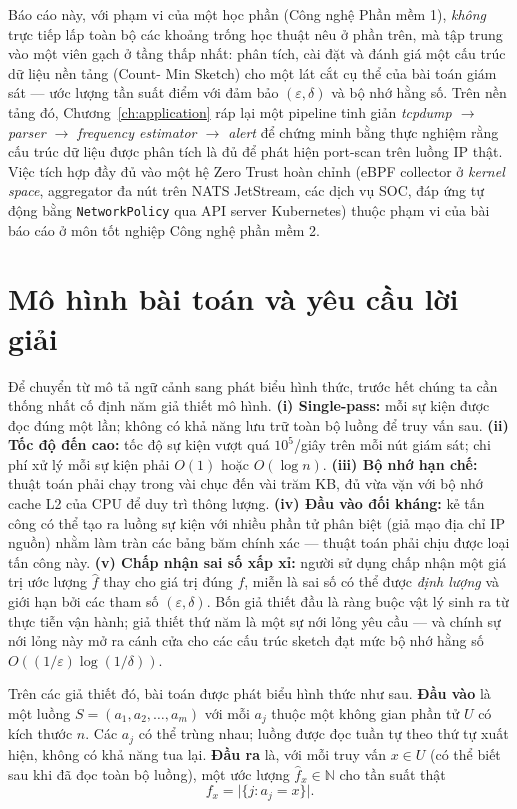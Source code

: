 Báo cáo này, với phạm vi của một học phần (Công nghệ Phần mềm 1), \textit{không} trực tiếp lấp toàn bộ các khoảng trống học thuật nêu ở phần trên, mà tập trung vào một viên gạch ở tầng thấp nhất: phân tích, cài đặt và đánh giá một cấu trúc dữ liệu nền tảng (Count\nobreakdash- Min Sketch) cho một lát cắt cụ thể của bài toán giám sát --- ước lượng tần suất điểm với đảm bảo $(\varepsilon, \delta)$ và bộ nhớ hằng số. Trên nền tảng đó, Chương~\ref{ch:application} ráp lại một pipeline tinh giản \textit{tcpdump $\rightarrow$ parser $\rightarrow$ frequency estimator $\rightarrow$ alert} để chứng minh bằng thực nghiệm rằng cấu trúc dữ liệu được phân tích là đủ để phát hiện port-scan trên luồng IP thật. Việc tích hợp đầy đủ vào một hệ Zero Trust hoàn chỉnh (eBPF collector ở \textit{kernel space}, aggregator đa nút trên NATS JetStream, các dịch vụ SOC, đáp ứng tự động bằng \texttt{NetworkPolicy} qua API server Kubernetes) thuộc phạm vi của bài báo cáo ở môn tốt nghiệp Công nghệ phần mềm 2.

\section{Mô hình bài toán và yêu cầu lời giải}
\label{sec:problem-statement}

Để chuyển từ mô tả ngữ cảnh sang phát biểu hình thức, trước hết chúng ta cần thống nhất cố định năm giả thiết mô hình. \textbf{(i) Single-pass:} mỗi sự kiện được đọc đúng một lần; không có khả năng lưu trữ toàn bộ luồng để truy vấn sau. \textbf{(ii) Tốc độ đến cao:} tốc độ sự kiện vượt quá $10^5$/giây trên mỗi nút giám sát; chi phí xử lý mỗi sự kiện phải $O(1)$ hoặc $O(\log n)$. \textbf{(iii) Bộ nhớ hạn chế:} thuật toán phải chạy trong vài chục đến vài trăm KB, đủ vừa vặn với bộ nhớ cache L2 của CPU để duy trì thông lượng. \textbf{(iv) Đầu vào đối kháng:} kẻ tấn công có thể tạo ra luồng sự kiện với nhiều phần tử phân biệt (giả mạo địa chỉ IP nguồn) nhằm làm tràn các bảng băm chính xác --- thuật toán phải chịu được loại tấn công này. \textbf{(v) Chấp nhận sai số xấp xỉ:} người sử dụng chấp nhận một giá trị ước lượng $\hat{f}$ thay cho giá trị đúng $f$, miễn là sai số có thể được \textit{định lượng} và giới hạn bởi các tham số $(\varepsilon, \delta)$. Bốn giả thiết đầu là ràng buộc vật lý sinh ra từ thực tiễn vận hành; giả thiết thứ năm là một sự nới lỏng yêu cầu --- và chính sự nới lỏng này mở ra cánh cửa cho các cấu trúc sketch đạt mức bộ nhớ hằng số $O((1/\varepsilon)\log(1/\delta))$.

Trên các giả thiết đó, bài toán được phát biểu hình thức như sau. \textbf{Đầu vào} là một luồng $S = (a_1, a_2, \ldots, a_m)$ với mỗi $a_j$ thuộc một không gian phần tử $U$ có kích thước $n$. Các $a_j$ có thể trùng nhau; luồng được đọc tuần tự theo thứ tự xuất hiện, không có khả năng tua lại. \textbf{Đầu ra} là, với mỗi truy vấn $x \in U$ (có thể biết sau khi đã đọc toàn bộ luồng), một ước lượng $\hat{f}_x \in \mathbb{N}$ cho tần suất thật
\begin{equation}
f_x = \bigl|\{j : a_j = x\}\bigr|.
\label{eq:point-query-frequency}
\end{equation}

